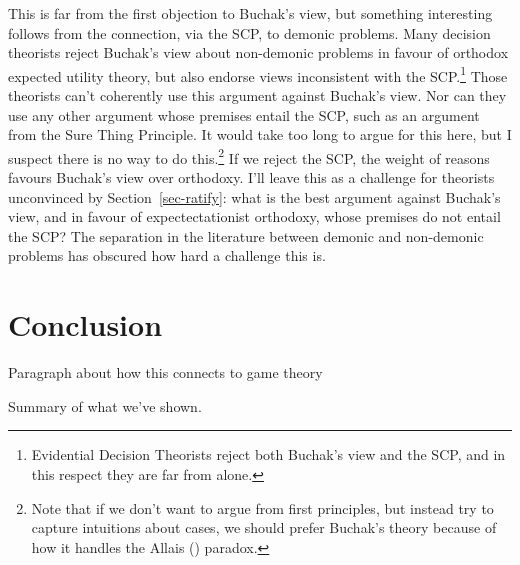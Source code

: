 \documentclass[
  10pt,
  letterpaper,
  DIV=11,
  numbers=noendperiod,
  twoside]{scrartcl}
\begin{document}
This is far from the first objection to Buchak's view, but something
interesting follows from the connection, via the SCP, to demonic
problems. Many decision theorists reject Buchak's view about non-demonic
problems in favour of orthodox expected utility theory, but also endorse
views inconsistent with the SCP.\footnote{Evidential Decision Theorists
  reject both Buchak's view and the SCP, and in this respect they are
  far from alone.} Those theorists can't coherently use this argument
against Buchak's view. Nor can they use any other argument whose
premises entail the SCP, such as an argument from the Sure Thing
Principle. It would take too long to argue for this here, but I suspect
there is no way to do this.\footnote{Note that if we don't want to argue
  from first principles, but instead try to capture intuitions about
  cases, we should prefer Buchak's theory because of how it handles the
  Allais () paradox.} If we reject the
SCP, the weight of reasons favours Buchak's view over orthodoxy. I'll
leave this as a challenge for theorists unconvinced by
Section~\ref{sec-ratify}: what is the best argument against Buchak's
view, and in favour of expectectationist orthodoxy, whose premises do
not entail the SCP? The separation in the literature between demonic and
non-demonic problems has obscured how hard a challenge this is.

\section{Conclusion}\label{conclusion}

Paragraph about how this connects to game theory

Summary of what we've shown.
\end{document}
